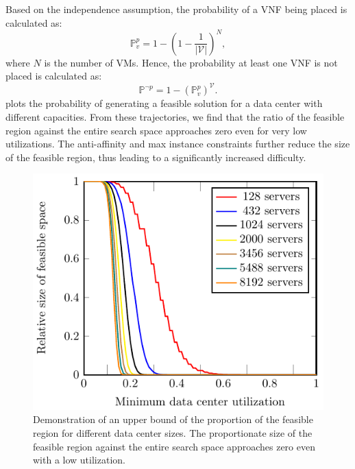 Based on the independence assumption, the probability of a VNF being placed is calculated as:
\begin{equation}
	\mathbb{P}^p_{v}=1-\left(1-\frac{1}{|\mathcal{V}|}\right)^N,
\end{equation}
where $N$ is the number of VMs. Hence, the probability at least one VNF is not placed is calculated as:
\begin{equation}
	\mathbb{P}^{\neg p}=1-\left(\mathbb{P}^p_v\right)^{\mathcal{V}}.
\end{equation}
 plots the probability of generating a feasible solution for a data center with different capacities. From these trajectories, we find that the ratio of the feasible region against the entire search space approaches zero even for very low utilizations. The anti-affinity and max instance constraints further reduce the size of the feasible region, thus leading to a significantly increased difficulty.
\begin{figure}[t!]
	\centering
	\includegraphics[width=\linewidth]{graphs/general/p_feasible}
	\caption{Demonstration of an upper bound of the proportion of the feasible region for different data center sizes. The proportionate size of the feasible region against the entire search space approaches zero even with a low utilization.}
	\label{fig:p_feasible}
	\vspace{1em}
\end{figure}

